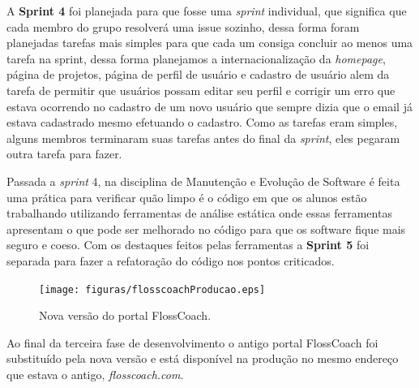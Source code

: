 A \textbf{Sprint 4} foi planejada para que fosse uma \textit{sprint} individual, que
significa que cada membro do grupo resolverá uma issue sozinho, dessa forma foram 
planejadas tarefas mais simples para que cada um consiga concluir ao menos uma
tarefa na sprint, dessa forma planejamos a internacionalização da \textit{homepage},
página de projetos, página de perfil de usuário e cadastro de usuário alem da 
tarefa de permitir que usuários possam editar seu perfil e corrigir um erro que
estava ocorrendo no cadastro de um novo usuário que sempre dizia que o email já
estava cadastrado mesmo efetuando o  cadastro. Como as tarefas eram simples,
alguns membros terminaram suas tarefas antes do final da \textit{sprint}, eles 
pegaram outra tarefa para fazer.

Passada a \textit{sprint} 4, na disciplina de Manutenção e Evolução de Software é feita uma prática
para verificar quão limpo é o código em que os alunos estão trabalhando utilizando
ferramentas de análise estática onde essas ferramentas apresentam o que pode ser melhorado 
no código para que os software fique mais seguro e coeso. Com os destaques feitos pelas
ferramentas a \textbf{Sprint 5} foi separada para fazer a refatoração do código
nos pontos criticados.

\begin{figure}[h]
	\centering
	\label{fig:producao}
		\texttt{[image: figuras/flosscoachProducao.eps]}
	\caption{Nova versão do portal FlossCoach.}
\end{figure}

Ao final da terceira fase de desenvolvimento o antigo portal FlossCoach foi substituído pela
nova versão e está disponível na produção no mesmo endereço que estava o antigo, \textit{flosscoach.com}.
